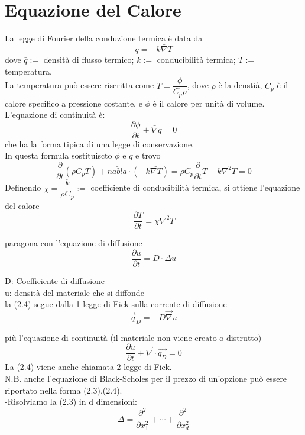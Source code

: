 \documentclass[a4paper,11pt]{report}
\begin{document}
\chapter{Equazione del Calore}
La legge di Fourier della conduzione termica è data da 
\begin{equation}
\bar{q} =-k\bar{\nabla}T
\end{equation}
dove $\bar{q}:=$ densità di flusso termico; $k:=$ conducibilità termica; $T:=$ temperatura.\\
La temperatura può essere riscritta come $ T=\dfrac{\phi}{C_p \rho}$, dove $\rho$ è la denstià, $C_p$ è il calore specifico a pressione costante, e $\phi$ è il calore per unità di volume.\\
L'equazione di continuità è:
\begin{equation}
\dfrac{\partial \phi}{\partial t} + \bar{\nabla}\bar{q}=0
\end{equation}
che ha la forma tipica di una legge di conservazione.\\
In questa formula sostituiscto $\phi$ e $\bar{q}$ e trovo
$$
\dfrac{\partial}{\partial t}(\rho C_p T) + \bar{nabla}\cdot(-k\bar{\nabla T}) = \rho C_p \dfrac{\partial}{\partial t}T - k \nabla^2 T=0
$$
Definendo $\chi=\dfrac{k}{\rho C_p}:=$ coefficiente di conducibilità termica, si ottiene l'\underline{equazione del calore}
\begin{equation}
\dfrac{\partial T}{\partial t}=\chi \nabla^2 T
\end{equation}


paragona con l'equazione di diffusione 
\begin{equation}
\dfrac{\partial u}{\partial t}=D\cdot \Delta u
\end{equation}

D: Coefficiente di diffusione\\
u: densità del materiale che si diffonde\\

la (2.4) segue dalla 1 legge di Fick sulla corrente di diffusione
\begin{equation}
\overrightarrow{q}_{D}=-D\overrightarrow{\nabla}u
\end{equation}

più l'equazione di continuità (il materiale non viene creato o distrutto)
$$
\dfrac{\partial u}{\partial t}+\overrightarrow{\nabla}\cdot\overrightarrow{q_D}=0
$$
La (2.4) viene anche chiamata 2 legge di Fick.\\
N.B. anche l'equazione di Black-Scholes per il prezzo di un'opzione può essere riportato nella forma (2.3),(2.4).\\
-Risolviamo la (2.3) in d dimensioni:
\begin{equation}
\Delta=\dfrac{\partial^2}{\partial x_{1}^2}+\cdots+\dfrac{\partial^2}{\partial x_{d}^2} 
\end{equation}
\end{document}
